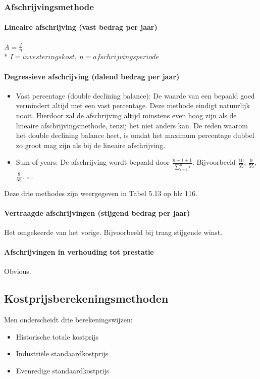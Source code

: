 \documentclass[12pt]{article}
\begin{document}
\subsubsection{Afschrijvingsmethode}
\paragraph{Lineaire afschrijving (vast bedrag per jaar)}
$A = \frac{I}{n}$\\*
$I = investeringskost,\ n = afschrijvingsperiode$
\paragraph{Degressieve afschrijving (dalend bedrag per jaar)}
\begin{itemize}
\item Vast percentage (double declining balance): De waarde van een bepaald goed vermindert altijd met een vast percentage. Deze methode eindigt natuurlijk nooit. Hierdoor zal de afschrijving altijd minstens even hoog zijn als de lineaire afschrijvingsmethode, tenzij het niet anders kan. De reden waarom het double declining balance heet, is omdat het maximum percentage dubbel zo groot mag zijn als bij de lineaire afschrijving.
\item Sum-of-years: De afschrijving wordt bepaald door $\frac{n-i+1}{\sum_{i = 1}^{n} i}$. Bijvoorbeeld $\frac{10}{55}$, $\frac{9}{55}$, $\frac{8}{55}$, \dots.
\end{itemize}
Deze drie methodes zijn weergegeven in Tabel 5.13 op blz 116.
\paragraph{Vertraagde afschrijvingen (stijgend bedrag per jaar)}
Het omgekeerde van het vorige. Bijvoorbeeld bij traag stijgende winst.
\paragraph{Afschrijvingen in verhouding tot prestatie}
Obvious.
\subsection{Kostprijsberekeningsmethoden}
Men onderscheidt drie berekeningswijzen:
\begin{itemize}
\item Historische totale kostprijs
\item Industri\"ele standaardkostprijs
\item Evenredige standaardkostprijs
\end{itemize}
\end{document}
